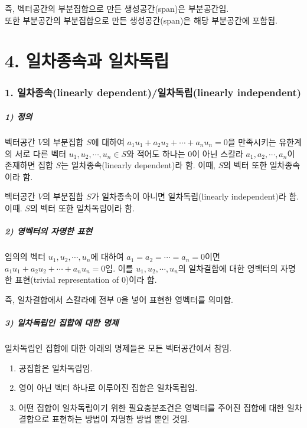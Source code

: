 \documentclass[10pt, a4paper]{article}
\begin{document}
즉, 벡터공간의 부분집합으로 만든 생성공간(span)은 부분공간임.\\
또한 부분공간의 부분집합으로 만든 생성공간(span)은 해당 부분공간에 포함됨.\\


\newpage


\part*{4. 일차종속과 일차독립}

\section*{1. 일차종속(linearly dependent)/일차독립(linearly independent)}

\subsubsection*{1) 정의}
벡터공간 $V$의 부분집합 $S$에 대하여 $a_1u_1+a_2u_2+ \cdots +a_nu_n=0$을 만족시키는 유한계의 서로 다른 벡터 $u_1,u_2, \cdots ,u_n \in S$와 적어도 하나는 0이 아닌 스칼라 $a_1,a_2, \cdots ,a_n$이 존재하면 집합 $S$는 일차종속(linearly dependent)라 함. 이때, $S$의 벡터 또한 일차종속이라 함.

벡터공간 $V$의 부분집합 $S$가 일차종속이 아니면 일차독립(linearly independent)라 함. 이때. $S$의 벡터 또한 일차독립이라 함.

\subsubsection*{2) 영벡터의 자명한 표현}
임의의 벡터 $u_1,u_2, \cdots ,u_n$에 대하여 $a_1=a_2= \cdots =a_n=0$이면 $a_1u_1+a_2u_2+ \cdots +a_nu_n=0$임. 이를 $u_1,u_2, \cdots ,u_n$의 일차결합에 대한 영벡터의 자명한 표현(trivial representation of 0)이라 함.

즉, 일차결합에서 스칼라에 전부 0을 넣어 표현한 영벡터를 의미함.


\subsubsection*{3) 일차독립인 집합에 대한 명제}
일차독립인 집합에 대한 아래의 명제들은 모든 벡터공간에서 참임.

\begin{enumerate}
    \item 공집합은 일차독립임.
    \item 영이 아닌 벡터 하나로 이루어진 집합은 일차독립임.
    \item 어떤 집합이 일차독립이기 위한 필요충분조건은 영벡터를 주어진 집합에 대한 일차결합으로 표현하는 방법이 자명한 방법 뿐인 것임.
\end{enumerate}
\end{document}
